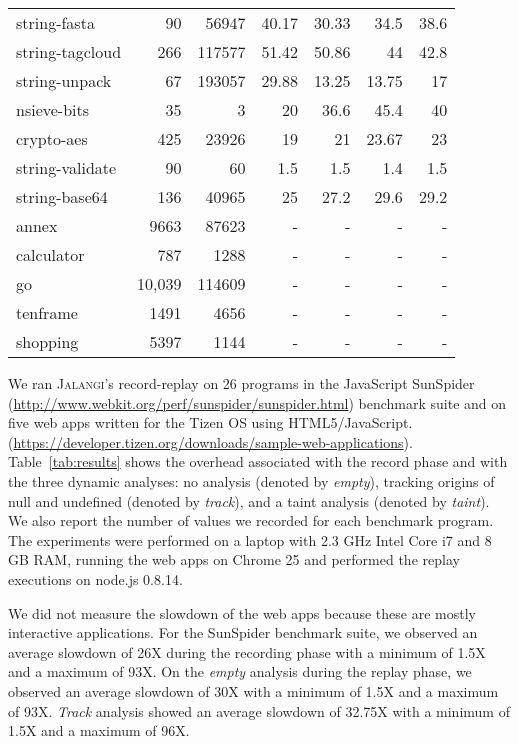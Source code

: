 \documentclass{sig-alternate}
\def\jalangi{\textsc{Jalangi}}
\begin{document}
\begin{table}
{\begin{center}
\begin{tabular}{|l|r|r|r|r|r|r|}
string-fasta& 90 & 56947 & 40.17 & 30.33 & 34.5 & 38.6\\
string-tagcloud& 266 & 117577 & 51.42 & 50.86 & 44 & 42.8\\
string-unpack& 67 & 193057 & 29.88 & 13.25 & 13.75 & 17\\
nsieve-bits& 35 & 3 & 20 & 36.6 & 45.4 & 40 \\
crypto-aes& 425 & 23926  & 19 & 21 & 23.67 & 23 \\
string-validate& 90 & 60 & 1.5 & 1.5 & 1.4 & 1.5\\
string-base64& 136 & 40965 & 25 & 27.2 & 29.6 & 29.2\\
\hline 
annex& 9663 & 87623 & - & - & - & - \\
calculator& 787 & 1288 & - & - & - & - \\
 go& 10,039 & 114609 & - & - & - & - \\
tenframe& 1491 &4656 & - & - & - & - \\
shopping& 5397 & 1144 & - & - & - & - \\
\hline 
\end{tabular}
\end{center}}
\end{table}

We ran \jalangi{}'s record-replay on 26 programs in the JavaScript
SunSpider (\url{http://www.webkit.org/perf/sunspider/sunspider.html})
benchmark suite and on five web apps written for the Tizen OS using
HTML5/JavaScript.
(\url{https://developer.tizen.org/downloads/sample-web-applications}).
Table~\ref{tab:results} shows the overhead associated with the record
phase and with the three dynamic analyses: no analysis (denoted by
\emph{empty}), tracking origins of null and undefined (denoted by
\emph{track}), and a taint analysis (denoted by \emph{taint}).  We
also report the number of values we recorded for each benchmark
program.  The experiments were performed on a laptop with 2.3 GHz
Intel Core i7 and 8 GB RAM, running the web apps on Chrome 25 and
performed the replay executions on node.js 0.8.14.

We did not measure the slowdown of the web apps because these are
mostly interactive applications.  For the SunSpider benchmark suite,
we observed an average slowdown of 26X during the recording phase with
a minimum of 1.5X and a maximum of 93X.  On the \emph{empty} analysis
during the replay phase, we observed an average slowdown of 30X with a
minimum of 1.5X and a maximum of 93X.  \emph{Track} analysis showed an
average slowdown of 32.75X with a minimum of 1.5X and a maximum of
96X.
\end{document}
